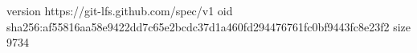 version https://git-lfs.github.com/spec/v1
oid sha256:af55816aa58e9422dd7c65e2bcdc37d1a460fd294476761fc0bf9443fc8e23f2
size 9734
